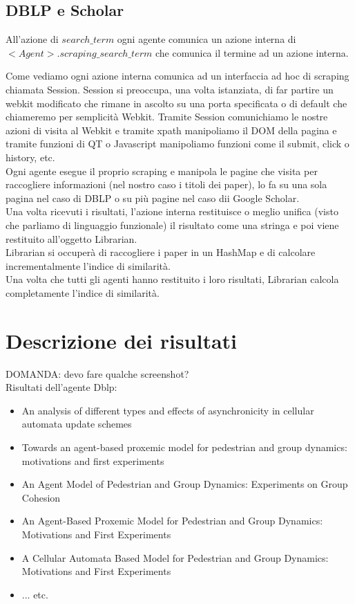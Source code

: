 \documentclass[12pt]{article}
\begin{document}
\subsection{DBLP e Scholar}
All'azione di $search\_term$ ogni agente comunica un azione interna di $<Agent>.scraping\_search\_term$ che comunica il termine ad un azione interna.




Come vediamo ogni azione interna comunica ad un interfaccia ad hoc di scraping chiamata Session. Session si preoccupa, una volta istanziata, di far partire un webkit modificato che rimane in ascolto su una porta specificata o di default che chiameremo per semplicit\`a Webkit. Tramite Session comunichiamo le nostre azioni di visita al Webkit e tramite xpath manipoliamo il DOM della pagina e tramite funzioni di QT o Javascript manipoliamo funzioni come il submit, click o history, etc. \\
Ogni agente esegue il proprio scraping e manipola le pagine che visita per raccogliere informazioni (nel nostro caso i titoli dei paper), lo fa su una sola pagina nel caso di DBLP o su pi\`u pagine nel caso dii Google Scholar.\\
Una volta ricevuti i risultati, l'azione interna restituisce o meglio unifica (visto che parliamo di linguaggio funzionale) il risultato come una stringa e poi viene restituito all'oggetto Librarian. \\
Librarian si occuper\`a di raccogliere i paper in un HashMap e di calcolare incrementalmente l'indice di similarit\`a. \\
Una volta che tutti gli agenti hanno restituito i loro risultati, Librarian calcola completamente l'indice di similarit\`a.

\section{Descrizione dei risultati}
DOMANDA: devo fare qualche screenshot? \\

Risultati dell'agente Dblp:
\begin{itemize}
\item An analysis of different types and effects of asynchronicity in cellular automata update schemes
\item Towards an agent-based proxemic model for pedestrian and group dynamics: motivations and first experiments
\item An Agent Model of Pedestrian and Group Dynamics: Experiments on Group Cohesion
\item An Agent-Based Proxemic Model for Pedestrian and Group Dynamics: Motivations and First Experiments
\item A Cellular Automata Based Model for Pedestrian and Group Dynamics: Motivations and First Experiments
\item ... etc.
\end{itemize}
\end{document}
